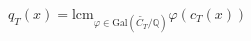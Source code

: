 \documentclass[preview]{standalone}
\begin{document}
\begin{center}
$\displaystyle q_T(x) = \text{lcm}_{\varphi \in \text{Gal}\left(\widetilde{C_T}/\mathbb{Q}\right)} \varphi(c_T(x))$
\end{center}
\end{document}
